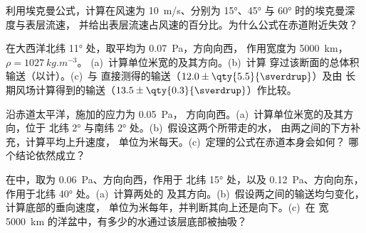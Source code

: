 \begin{exercise}[$\star$]\label{exo:b1:ocean-circulation:4}
利用埃克曼公式，计算在风速为
\qty{10}{m/s}、分别为 \ang{15}、\ang{45} 与 \ang{60} 时的埃克曼深度与表层流速，
并给出表层流速占风速的百分比。为什么公式在赤道附近失效？
\end{exercise}

\begin{exercise}[$\star\star$]\label{exo:b1:ocean-circulation:5}
在大西洋北纬 \ang{11} 处，取平均为 \qty{0.07}{Pa}，方向向西，
作用宽度为 \qty{5000}{km}，$\rho = \qty{1027}{kg.m^{-3}}$。
(a)~计算单位米宽的及其方向。(b)~计算
穿过该断面的总体积输送（以计）。(c)~与
直接测得的输送（$12.0 \pm \qty{5.5}{\sverdrup}$）及由
长期风场计算得到的输送（$13.5 \pm \qty{0.3}{\sverdrup}$）作比较。
\end{exercise}

\begin{exercise}[$\star\star$]\label{exo:b1:ocean-circulation:6}
沿赤道太平洋，施加的应力为 \qty{0.05}{Pa}，
方向向西。(a)~计算单位米宽的及其方向，位于
北纬 \ang{2} 与南纬 \ang{2} 处。(b)~假设这两个所带走的水，
由两之间的下方补充，计算平均上升速度，
单位为米每天。(c)~定理的公式在赤道本身会如何？
哪个结论依然成立？
\end{exercise}

\begin{exercise}[$\star\star$]\label{exo:b1:ocean-circulation:7}
在中，取为 \qty{0.06}{Pa}、方向向西，作用于
北纬 \ang{15} 处，以及 \qty{0.12}{Pa}、方向向东，作用于北纬 \ang{40} 处。(a)~计算两处的
及其方向。(b)~假设两之间的输送均匀变化，
计算底部的垂向速度，
单位为米每年，并判断其向上还是向下。(c)~在
宽 \qty{5000}{km} 的洋盆中，有多少的水通过该层底部被抽吸？
\end{exercise}

